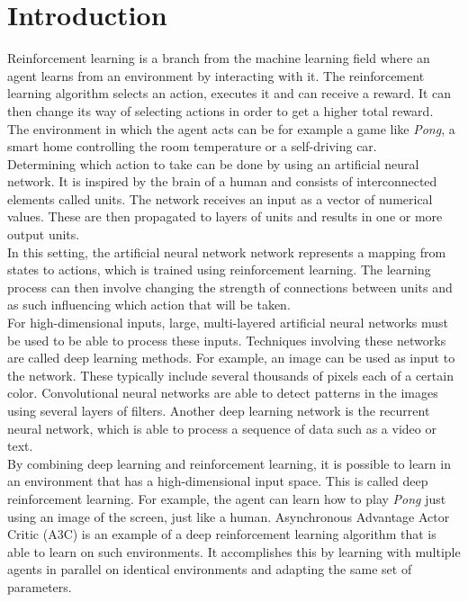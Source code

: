 \chapter{Introduction}

Reinforcement learning is a branch from the machine learning field where an agent learns from an environment by interacting with it.
The reinforcement learning algorithm selects an action, executes it and can receive a reward.
It can then change its way of selecting actions in order to get a higher total reward.\\
The environment in which the agent acts can be for example a game like \textit{Pong}, a smart home controlling the room temperature or a self-driving car.\\

Determining which action to take can be done by using an artificial neural network.
It is inspired by the brain of a human and consists of interconnected elements called units.
The network receives an input as a vector of numerical values.
These are then propagated to layers of units and results in one or more output units.\\
In this setting, the artificial neural network network represents a mapping from states to actions, which is trained using reinforcement learning.
The learning process can then involve changing the strength of connections between units and as such influencing which action that will be taken.\\

For high-dimensional inputs, large, multi-layered artificial neural networks must be used to be able to process these inputs. Techniques involving these networks are called deep learning methods.
For example, an image can be used as input to the network.
These typically include several thousands of pixels each of a certain color.
Convolutional neural networks are able to detect patterns in the images using several layers of filters.
Another deep learning network is the recurrent neural network, which is able to process a sequence of data such as a video or text.\\

By combining deep learning and reinforcement learning, it is possible to learn in an environment that has a high-dimensional input space. This is called deep reinforcement learning.
For example, the agent can learn how to play \textit{Pong} just using an image of the screen, just like a human.
Asynchronous Advantage Actor Critic (A3C) is an example of a deep reinforcement learning algorithm that is able to learn on such environments. It accomplishes this by learning with multiple agents in parallel on identical environments and adapting the same set of parameters.\\

